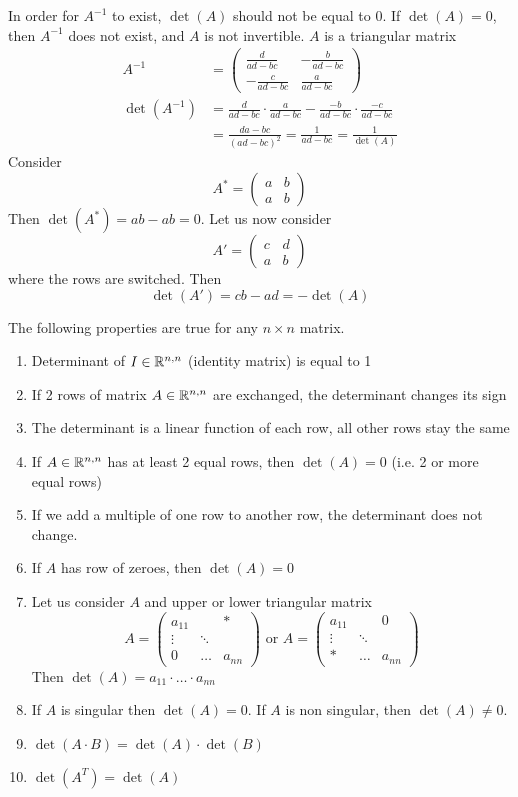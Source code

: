 In order for $A^{-1}$ to exist, $\det(A)$ should not be equal to 0. If $\det(A)=0$, then $A^{-1}$ does not exist, and $A$ is not invertible. $A$ is a triangular matrix
\begin{align*}
A^{-1} &= \begin{pmatrix}
\frac{d}{ad-bc} & -\frac{b}{ad-bc}\\
-\frac{c}{ad-bc} & \frac{a}{ad-bc}
\end{pmatrix}\\
\det(A^{-1}) &= \frac{d}{ad-bc}\cdot\frac{a}{ad-bc}-\frac{-b}{ad-bc}\cdot \frac{-c}{ad-bc}\\
 &= \frac{da-bc}{(ad-bc)^2} = \frac{1}{ad-bc} = \frac{1}{\det(A)}
\end{align*}
Consider 
\[
A^\ast = \begin{pmatrix}
a & b\\
a & b
\end{pmatrix}
\]
Then $\det(A^\ast) = ab-ab = 0$. Let us now consider 
\[
A' = \begin{pmatrix}
c & d \\
a & b
\end{pmatrix}
\]
where the rows are switched. Then
\[
\det(A') = cb-ad = -\det(A)
\]
\begin{properties}
The following properties are true for any $n\times n$ matrix.
\begin{enumerate}
\item Determinant of $I\in\mathbb{R}^{n,n}$ (identity matrix) is equal to 1
\item If 2 rows of matrix $A\in\mathbb{R}^{n,n}$ are exchanged, the determinant changes its sign
\item The determinant is a linear function of each row, all other rows stay the same
\item If $A\in\mathbb{R}^{n,n}$ has at least 2 equal rows, then $\det(A)=0$ (i.e. 2 or more equal rows)
\item If we add a multiple of one row to another row, the determinant does not change. 
\item If $A$ has row of zeroes, then $\det(A)=0$
\item Let us consider $A$ and upper or lower triangular matrix
\[ A = \begin{pmatrix}
a_{11} & {} & \ast\\
\vdots & \ddots & {} \\
0 & \dots & a_{nn} 	
\end{pmatrix}\text{ or }A = \begin{pmatrix}
a_{11} & {} & 0\\
\vdots & \ddots & {} \\
\ast & \dots & a_{nn} 	
\end{pmatrix}
\]
Then $\det(A)=a_{11}\cdot \dots\cdot a_{nn}$
\item If $A$ is singular then $\det(A)=0$. If $A$ is non singular, then $\det(A)\not=0$.
\item $\det(A\cdot B) = \det(A)\cdot \det(B)$
\item $\det(A^T) = \det(A)$
\end{enumerate}
	
\end{properties}

